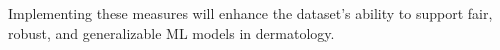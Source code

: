 \documentclass[12pt, a4paper, oneside]{book}   	%
\begin{document}
		Implementing these measures will enhance the dataset’s ability to support fair, robust, and generalizable \gls{ML} models in dermatology.
	
	
	
	
		\newpage
	
	
	\chapter{\bibname}
		\printbibliography[heading=none]
		
		
		
		\newpage
		\appendix
\end{document}
